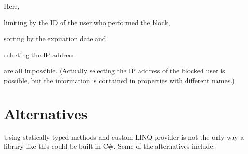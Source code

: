 Here,
\begin{compactitem}
\item limiting by the ID of the user who performed the block,
\item sorting by the expiration date and
\item selecting the \ac{IP} address
\end{compactitem}
are all impossible.
(Actually selecting the \ac{IP} address of the blocked user is possible,
but the information is contained in properties with different names.)

\section{Alternatives}
\label{alternatives}

Using statically typed methods and custom LINQ provider is not the only way a library like this
could be built in C\#.
Some of the alternatives include:

